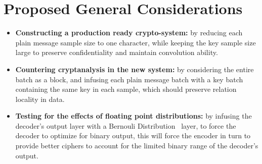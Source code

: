 \documentclass[a4paper, 12pt]{report}
\begin{document}
\section*{\textbf{Proposed General Considerations}}
	\begin{itemize}
		\item \textbf{Constructing a production ready crypto-system:} by reducing each plain message sample size to one character, while keeping the key sample size large to preserve confidentiality and maintain convolution ability.
		\item \textbf{Countering cryptanalysis in the new system:} by considering the entire batch as a block, and infusing each plain message batch with a key batch containing the same key in each sample, which should preserve relation locality in data.
		\item \textbf{Testing for the effects of floating point distributions:} by infusing the decoder's output layer with a Bernouli Distribution~\citep{http://mathworld.wolfram.com/BernoulliDistribution.html} layer, to force the decoder to optimize for binary output, this will force the encoder in turn to provide better ciphers to account for the limited binary range of the decoder's output.
	\end{itemize}
\end{document}
